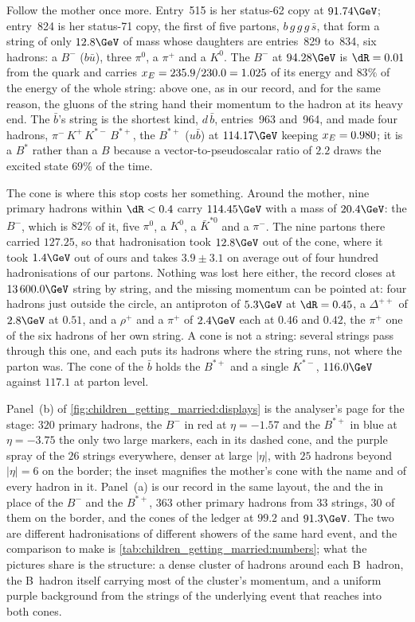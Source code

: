 Follow the mother once more. Entry~515 is her status-62 copy at
$91.74\GeV$; entry~824 is her status-71 copy, the first of five partons,
$b\,g\,g\,g\,\bar s$, that form a string of only $12.8\GeV$ of mass whose
daughters are entries~829 to~834, six hadrons: a $B^-$ ($b\bar u$), three
$\pi^0$, a $\pi^+$ and a $K^0$. The $B^-$ at $94.28\GeV$ is $\dR=0.01$
from the quark and carries $x_E=235.9/230.0=1.025$ of its energy and
$83\%$ of the energy of the whole string: above one, as in our record, and
for the same reason, the gluons of the string hand their momentum to the
hadron at its heavy end. The $\bar b$'s string is the shortest kind,
$d\,\bar b$, entries~963 and~964, and made four hadrons,
$\pi^-\,K^+\,K^{*-}\,B^{*+}$, the $B^{*+}$ ($u\bar b$) at $114.17\GeV$
keeping $x_E=0.980$; it is a $B^*$ rather than a $B$ because a
vector-to-pseudoscalar ratio of $2.2$ draws the excited state $69\%$ of
the time.

The cone is where this stop costs her something. Around the mother, nine
primary hadrons within $\dR<0.4$ carry $114.45\GeV$ with a mass of
$20.4\GeV$: the $B^-$, which is $82\%$ of it, five $\pi^0$, a $K^0$, a
$\bar K^{*0}$ and a $\pi^-$. The nine partons there carried $127.25$, so
that hadronisation took $12.8\GeV$ out of the cone, where it took
$1.4\GeV$ out of ours and takes $3.9\pm3.1$ on average out of four hundred
hadronisations of our partons. Nothing was lost here either, the record
closes at $13\,600.0\GeV$ string by string, and the missing momentum can
be pointed at: four hadrons just outside the circle, an antiproton of
$5.3\GeV$ at $\dR=0.45$, a $\Delta^{++}$ of $2.8\GeV$ at $0.51$, and a
$\rho^+$ and a $\pi^+$ of $2.4\GeV$ each at $0.46$ and $0.42$, the $\pi^+$
one of the six hadrons of her own string. A cone is not a string: several
strings pass through this one, and each puts its hadrons where the string
runs, not where the parton was. The cone of the $\bar b$ holds the
$B^{*+}$ and a single $K^{*-}$, $116.0\GeV$ against $117.1$ at parton
level.

Panel~(b) of \cref{fig:children_getting_married:displays} is the
analyser's page for the stage: $320$ primary hadrons, the $B^-$ in red at
$\eta=-1.57$ and the $B^{*+}$ in blue at $\eta=-3.75$ the only two large
markers, each in its dashed cone, and the purple spray of the $26$
strings everywhere, denser at large $|\eta|$, with $25$ hadrons beyond
$|\eta|=6$ on the border; the inset magnifies the mother's cone with the
name and \pt of every hadron in it. Panel~(a) is our record in the same
layout, the \Bstarbar and the \Bstar in place of the $B^-$ and the
$B^{*+}$, $363$ other primary hadrons from $33$ strings, $30$ of them on
the border, and the cones of the ledger at $99.2$ and $91.3\GeV$. The two
are different hadronisations of different showers of the same hard event,
and the comparison to make is \cref{tab:children_getting_married:numbers};
what the pictures share is the structure: a dense cluster of hadrons
around each B~hadron, the B~hadron itself carrying most of the cluster's
momentum, and a uniform purple background from the strings of the
underlying event that reaches into both cones.

